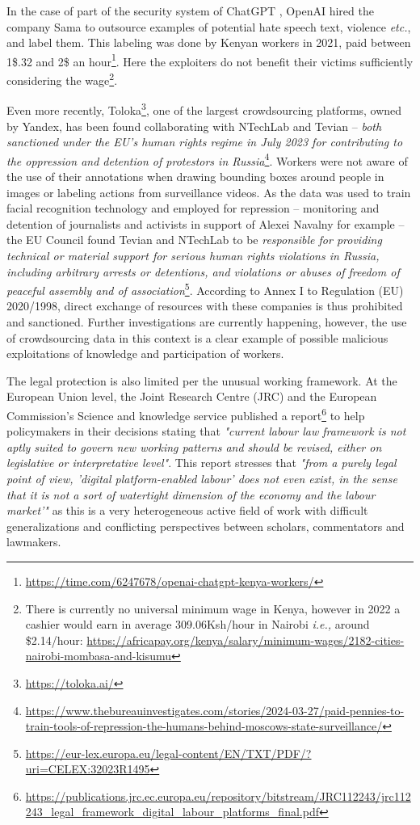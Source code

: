In the case of part of the security system of ChatGPT \citep{openai2023gpt4}, OpenAI hired the company Sama to outsource examples of potential hate speech text, violence \emph{etc.}, and label them.
This labeling was done by Kenyan workers in 2021, paid between 1\$.32 and 2\$ an hour\footnote{\url{https://time.com/6247678/openai-chatgpt-kenya-workers/}}. Here the exploiters do not benefit their victims sufficiently considering the wage\footnote{There is currently no universal minimum wage in Kenya, however in 2022 a cashier would earn in average 309.06Ksh/hour in Nairobi \emph{i.e.,} around \$2.14/hour: \url{https://africapay.org/kenya/salary/minimum-wages/2182-cities-nairobi-mombasa-and-kisumu}}.

Even more recently, Toloka\footnote{\url{https://toloka.ai/}}, one of the largest crowdsourcing platforms, owned by Yandex, has been found collaborating with NTechLab and Tevian -- \emph{both sanctioned under the EU's human rights regime in July 2023 for contributing to the oppression and detention of protestors in Russia}\footnote{\url{https://www.thebureauinvestigates.com/stories/2024-03-27/paid-pennies-to-train-tools-of-repression-the-humans-behind-moscows-state-surveillance/}}.
Workers were not aware of the use of their annotations when drawing bounding boxes around people in images or labeling actions from surveillance videos.
As the data was used to train facial recognition technology and employed for repression -- monitoring and detention of journalists and activists in support of Alexei Navalny for example -- the EU Council found Tevian and NTechLab to be \emph{responsible for providing technical or material support for serious human rights violations in Russia, including arbitrary arrests or detentions, and violations or abuses of freedom of peaceful assembly and of association}\footnote{\url{https://eur-lex.europa.eu/legal-content/EN/TXT/PDF/?uri=CELEX:32023R1495}}. According to Annex I to Regulation (EU) 2020/1998, direct exchange of resources with these companies is thus prohibited and sanctioned. Further investigations are currently happening, however, the use of crowdsourcing data in this context is a clear example of possible malicious exploitations of knowledge and participation of workers.

The legal protection is also limited per the unusual working framework. At the European Union level, the Joint Research Centre (JRC) and the European Commission’s Science and knowledge service published a report\footnote{\url{https://publications.jrc.ec.europa.eu/repository/bitstream/JRC112243/jrc112243_legal_framework_digital_labour_platforms_final.pdf}} to help policymakers in their decisions stating that \emph{"current labour law framework is not aptly suited to govern new working patterns and should be revised, either on legislative or interpretative level"}.
This report stresses that \emph{"from a purely legal point of view, 'digital platform-enabled labour' does not even exist, in the sense that it is not a sort of watertight dimension of the economy and the labour market'"} as this is a very heterogeneous active field of work with difficult generalizations and conflicting perspectives between scholars, commentators and lawmakers.

